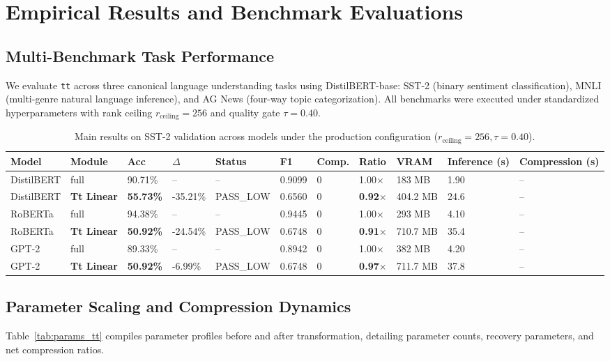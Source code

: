 \section{Empirical Results and Benchmark Evaluations}
\label{sec:results}

\subsection{Multi-Benchmark Task Performance}
We evaluate \texttt{tt} across three canonical language understanding tasks using DistilBERT-base: SST-2 (binary sentiment classification), MNLI (multi-genre natural language inference), and AG News (four-way topic categorization). All benchmarks were executed under standardized hyperparameters with rank ceiling $r_{\mathrm{ceiling}} = 256$ and quality gate $\tau = 0.40$.

\begin{table}[t]
\centering
\small
\begin{tabular}{lllllllllll}
\toprule
\textbf{Model} & \textbf{Module} & \textbf{Acc} & \textbf{$\Delta$} & \textbf{Status} & \textbf{F1} & \textbf{Comp.} & \textbf{Ratio} & \textbf{VRAM} & \textbf{Inference (s)} & \textbf{Compression (s)} \\
\midrule
DistilBERT & full & 90.71\% & -- & -- & 0.9099 & 0 & 1.00$\times$ & 183 MB & 1.90 & -- \\
DistilBERT & \textbf{Tt Linear} & \textbf{55.73\%} & -35.21\% & PASS_LOW & 0.6560 & 0 & \textbf{0.92$\times$} & 404.2 MB & 24.6 & -- \\
RoBERTa & full & 94.38\% & -- & -- & 0.9445 & 0 & 1.00$\times$ & 293 MB & 4.10 & -- \\
RoBERTa & \textbf{Tt Linear} & \textbf{50.92\%} & -24.54\% & PASS_LOW & 0.6748 & 0 & \textbf{0.91$\times$} & 710.7 MB & 35.4 & -- \\
GPT-2 & full & 89.33\% & -- & -- & 0.8942 & 0 & 1.00$\times$ & 382 MB & 4.20 & -- \\
GPT-2 & \textbf{Tt Linear} & \textbf{50.92\%} & -6.99\% & PASS_LOW & 0.6748 & 0 & \textbf{0.97$\times$} & 711.7 MB & 37.8 & -- \\
\bottomrule
\end{tabular}
\caption{Main results on SST-2 validation across models under the production configuration ($r_{\mathrm{ceiling}}=256, \tau=0.40$).}
\label{tab:main_sst2}
\end{table}

\subsection{Parameter Scaling and Compression Dynamics}
Table~\ref{tab:params_tt} compiles parameter profiles before and after transformation, detailing parameter counts, recovery parameters, and net compression ratios.


